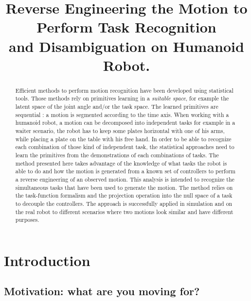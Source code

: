 \documentclass[letterpaper, 10pt, conference]{ieeeconf}      %
\title{\LARGE \bf
Reverse Engineering the Motion to Perform Task Recognition\\ and Disambiguation on Humanoid Robot.
}
\begin{document}
\maketitle
\thispagestyle{empty}
\pagestyle{empty}


\begin{abstract}
Efficient methods to perform motion recognition have been developed
using statistical tools. Those methods rely on primitives learning
in a \emph{suitable space}, for example the latent space of the joint angle and/or the task space.
The learned primitives are sequential : a motion is segmented according to the time axis.
When working with a humanoid robot, a motion can be decomposed into
independent tasks for example in a waiter scenario,
the robot has to keep some plates horizontal with one of his arms, while placing a plate
on the table with his free hand.
In order to be able to recognize each combination of those kind of independent task,
the statistical approaches need to learn the primitives from the demonstrations of each
combinations of tasks.
The method presented here
takes advantage of the knowledge of what tasks the robot is able to do and how
the motion is generated from a known set of controllers to perform a reverse engineering of an
observed motion. This analysis is intended to recognize the simultaneous tasks that
have been used to generate the motion. The method relies
on the task-function formalism and the projection operation into the null space of a task to decouple
the controllers.
The approach is successfully applied in simulation and on the real robot
to different scenarios where two motions look similar and have
different purposes.
\end{abstract}

\section{Introduction}
\subsection{Motivation: what are you moving for?}
\end{document}
